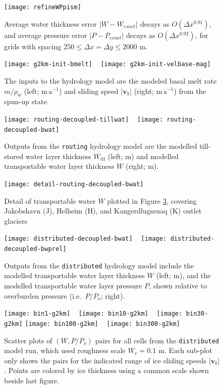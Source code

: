 \documentclass[gmd]{copernicus}   %
\newcommand{\text}{\textrm}
\newcommand\bv{\mathbf{v}}
\newcommand{\Wtil}{W_{\text{til}}}
\begin{document}
\begin{figure}[ht]
\texttt{[image: refineWPpism]}
\caption{Average water thickness error $|W-W_{exact}|$ decays as $O(\Delta x^{0.91})$, and average pressure error $|P-P_{exact}|$ decays as $O(\Delta x^{0.92})$, for grids with spacing $250 \le \Delta x = \Delta y \le 2000$ m.}
\label{fig:refineWPpism}
\end{figure}

\newcommand{\grnht}{3.4in}

\begin{figure}[ht]
\mbox{\texttt{[image: g2km-init-bmelt]} \,
\texttt{[image: g2km-init-velbase-mag]}}
\caption{The inputs to the hydrology model are the modeled basal melt rate $m/\rho_w$ (left; $\mathrm{m}\,\mathrm{a}^{-1}$) and sliding speed $|\bv_b|$ (right; $\mathrm{m}\,\mathrm{a}^{-1}$) from the spun-up state.}
\label{fig:Greenhydroinputs}
\end{figure}

\begin{figure}[ht]
\mbox{\texttt{[image: routing-decoupled-tillwat]} \,
\texttt{[image: routing-decoupled-bwat]}}
\caption{Outputs from the \texttt{routing} hydrology model are the modelled till-stored water layer thickness $\Wtil$ (left; $\mathrm{m}$) and modelled transportable water layer thickness $W$ (right; $\mathrm{m}$).}
\label{fig:Greenroutingresults}
\end{figure}

\begin{figure}[ht]
\texttt{[image: detail-routing-decoupled-bwat]}
\caption{Detail of transportable water $W$ plotted in Figure \ref{fig:Greenroutingresults}, covering Jakobshavn (J), Helheim (H), and Kangerdlugssuaq (K) outlet glaciers}
\label{fig:Greenroutingdetail}
\end{figure}

\begin{figure}[ht]
\mbox{\texttt{[image: distributed-decoupled-bwat]} \,
\texttt{[image: distributed-decoupled-bwprel]}}
\caption{Outputs from the \texttt{distributed} hydrology model include the modelled transportable water layer thickness $W$ (left; $\mathrm{m}$), and the modelled transportable water layer pressure $P$, shown relative to overburden pressure (i.e.~$P/P_o$; right).}
\label{fig:Greendistributedresults}
\end{figure}

\newcommand{\myheight}{1.8in}
\begin{figure}[ht]
\mbox{\texttt{[image: bin1-g2km]} \, \texttt{[image: bin10-g2km]} \, \texttt{[image: bin30-g2km]}}
\mbox{\texttt{[image: bin100-g2km]} \,
\texttt{[image: bin300-g2km]}}
\caption{Scatter plots of $(W,P/P_o)$ pairs for all cells from the \texttt{distributed} model run, which used roughness scale $W_r = 0.1$ m.  Each sub-plot only shows the pairs for the indicated range of ice sliding speeds $|\mathbf{v}_b|$.  Points are colored by ice thickness using a common scale shown beside last figure.}
\label{fig:GreenisPofW}
\end{figure}
\end{document}
